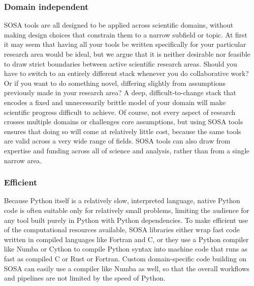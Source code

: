 \subsubsection{Domain independent}
SOSA tools are all designed to be applied across scientific domains, without making design choices that constrain them to a narrow subfield or topic. At first it may seem that having all your tools be written specifically for your particular research area would be ideal, but we argue that it is neither desirable nor feasible to draw strict boundaries between active scientific research areas. Should you have to switch to an entirely different stack whenever you do collaborative work? Or if you want to do something novel, differing slightly from assumptions previously made in your research area? A deep, difficult-to-change stack that encodes a fixed and unnecessarily brittle model of your domain will make scientific progress difficult to achieve. Of course, not every aspect of research crosses multiple domains or challenges core assumptions, but using SOSA tools ensures that doing so will come at relatively little cost, because the same tools are valid across a very wide range of fields. SOSA tools can also draw from expertise and funding across all of science and analysis, rather than from a single narrow area.

\subsubsection{Efficient}
Because Python itself is a relatively slow, interpreted language, native Python code is often suitable only for relatively small problems, limiting the audience for any tool built purely in Python with Python dependencies. To make efficient use of the computational resources available, SOSA libraries either wrap fast code written in compiled languages like Fortran and C, or they use a Python compiler like Numba \cite{lam:llvm15} or Cython \cite{behnel:cse11} to compile Python syntax into machine code that runs as fast as compiled C or Rust or Fortran. Custom domain-specific code building on SOSA can easily use a compiler like Numba as well, so that the overall workflows and pipelines are not limited by the speed of Python.

